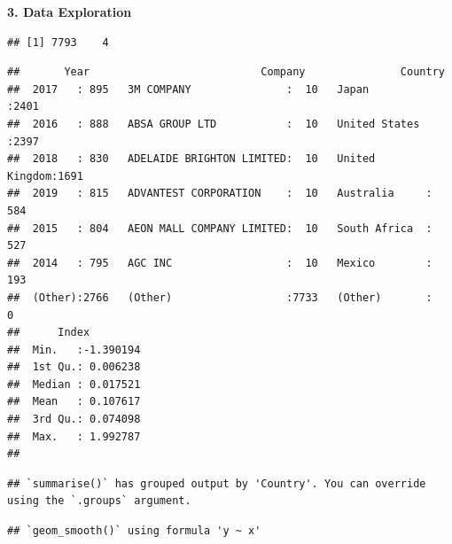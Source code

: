 \documentclass[
  12pt,
]{article}
\begin{document}
\textbf{3. Data Exploration}

\begin{verbatim}
## [1] 7793    4
\end{verbatim}

\begin{verbatim}
##       Year                           Company               Country    
##  2017   : 895   3M COMPANY               :  10   Japan         :2401  
##  2016   : 888   ABSA GROUP LTD           :  10   United States :2397  
##  2018   : 830   ADELAIDE BRIGHTON LIMITED:  10   United Kingdom:1691  
##  2019   : 815   ADVANTEST CORPORATION    :  10   Australia     : 584  
##  2015   : 804   AEON MALL COMPANY LIMITED:  10   South Africa  : 527  
##  2014   : 795   AGC INC                  :  10   Mexico        : 193  
##  (Other):2766   (Other)                  :7733   (Other)       :   0  
##      Index          
##  Min.   :-1.390194  
##  1st Qu.: 0.006238  
##  Median : 0.017521  
##  Mean   : 0.107617  
##  3rd Qu.: 0.074098  
##  Max.   : 1.992787  
## 
\end{verbatim}

\begin{verbatim}
## `summarise()` has grouped output by 'Country'. You can override using the `.groups` argument.
\end{verbatim}

\begin{verbatim}
## `geom_smooth()` using formula 'y ~ x'
\end{verbatim}
\end{document}
